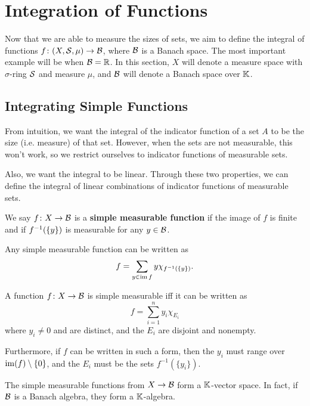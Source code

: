 \chapter{Integration of Functions}

Now that we are able to measure the sizes of sets, we aim to define the integral of functions $f \colon (X, \mathcal S, \mu) \to \mathcal B$, where $\mathcal B$ is a Banach space. The most important example will be when $\mathcal B = \mathbb R$. In this section, $X$ will denote a measure space with $\sigma$-ring $\mathcal S$ and measure $\mu$, and $\mathcal B$ will denote a Banach space over $\mathbb K$.

\section{Integrating Simple Functions}

From intuition, we want the integral of the indicator function of a set $A$ to be the size (i.e. measure) of that set. However, when the sets are not measurable, this won't work, so we restrict ourselves to indicator functions of measurable sets.

Also, we want the integral to be linear. Through these two properties, we can define the integral of linear combinations of indicator functions of measurable sets.

\begin{definition}
    We say $f \colon X \to \mathcal B$ is a \textbf{simple measurable function} if the image of $f$ is finite and if $f^{-1}\qty(\qty{y})$ is measurable for any $y \in \mathcal B$.
\end{definition}

\begin{lemma}
    Any simple measurable function can be written as \[f = \sum_{y \in \operatorname{im} f} y\chi_{f^{-1}(\{y\})}.\]
\end{lemma}

\begin{lemma}
    A function $f\colon X \to \mathcal B$ is simple measurable iff it can be written as \[f = \sum_{i= 1}^n y_i\chi_{E_i}\] where $y_i \ne 0$ and are distinct, and the $E_i$ are disjoint and nonempty.

    Furthermore, if $f$ can be written in such a form, then the $y_i$ must range over $\operatorname{im}(f) \setminus \qty{0}$, and the $E_i$ must be the sets $f^{-1}(\{y_i\})$.
\end{lemma}

\begin{proposition}
    The simple measurable functions from $X \to \mathcal B$ form a $\mathbb K$-vector space. In fact, if $\mathcal B$ is a Banach algebra, they form a $\mathbb K$-algebra.
\end{proposition}

